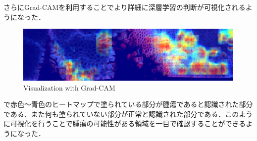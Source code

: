 さらにGrad-CAMを利用することでより詳細に深層学習の判断が可視化されるようになった．
\begin{figure}[H]
	\centering
	\includegraphics[width=0.7\linewidth]{fig/chapter4/large-grad-cam-step100-rm-black}
	\caption{Visualization with Grad-CAM}
	\label{fig:large-grad}
\end{figure}

で赤色〜青色のヒートマップで塗られている部分が腫瘍であると認識された部分である．また何も塗られていない部分が正常と認識された部分である．このように可視化を行うことで腫瘍の可能性がある領域を一目で確認することができるようになった．